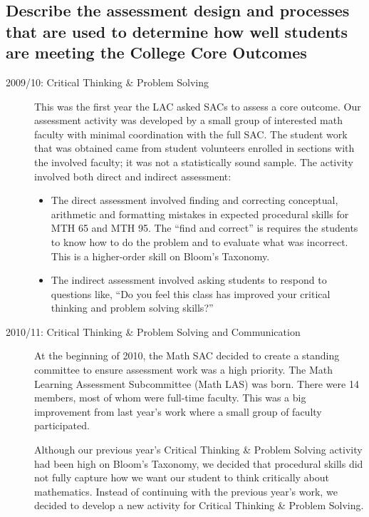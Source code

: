 \subsection{Describe the assessment design and processes that are used to determine how well students are meeting the College Core Outcomes}

\begin{description}
\item [2009/10: Critical Thinking  \& Problem Solving]

This was the first year the LAC asked SACs to assess a core outcome. Our assessment activity was developed by a small group of interested math faculty with minimal coordination with the full SAC. The student work that was obtained came from student volunteers enrolled in sections with the involved faculty; it was not a statistically sound sample.  The activity involved both direct and indirect assessment: 
\begin{itemize}
\item The direct assessment involved finding and correcting conceptual, arithmetic and formatting mistakes in expected procedural skills for MTH 65 and MTH 95.  The ``find and correct'' is requires the students to know how to do the problem and to evaluate what was incorrect.  This is a higher-order skill on Bloom's Taxonomy. 

\item The indirect assessment involved asking students to respond to questions like, ``Do you feel this class has improved your critical thinking and problem solving skills?''
\end{itemize}

\item[2010/11:  Critical Thinking \& Problem Solving and Communication]

At the beginning of 2010, the Math SAC decided to create a standing committee to ensure assessment work was a high priority. The Math Learning Assessment Subcommittee (Math LAS) was born.  There were 14 members, most of whom were full-time faculty. This was a big improvement from last year's work where a small group of faculty participated.

Although our previous year's Critical Thinking \& Problem Solving activity had been high on Bloom's Taxonomy, we decided that procedural skills did not fully capture how we want our student to think critically about mathematics.  Instead of continuing with the previous year's work, we decided to develop a new activity for Critical Thinking \& Problem Solving. 


\end{description}
